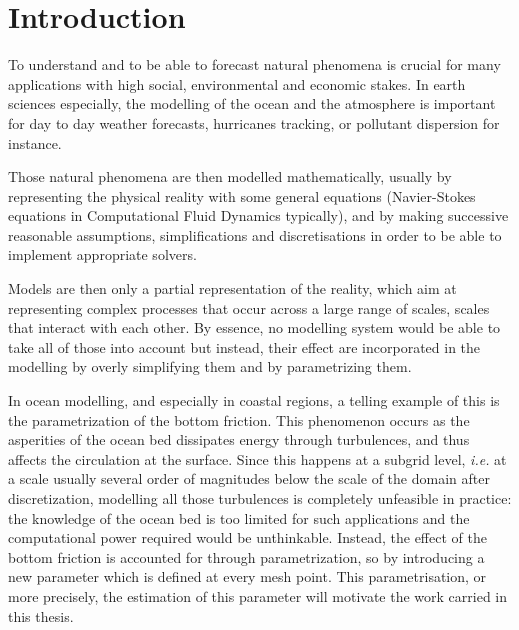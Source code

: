 \documentclass[../../Main_ManuscritThese.tex]{subfiles}
\begin{document}
\pagestyle{introStyle}
\chapter*{Introduction}
\TitleBtwLines
{}
{}
\label{chap:Introduction}
To understand and to be able to forecast natural phenomena is crucial
for many applications with high social, environmental and economic
stakes.  In earth sciences especially, the modelling of the ocean and
the atmosphere is important for day to day weather forecasts,
hurricanes tracking, or pollutant dispersion for instance. %

Those natural phenomena are then modelled mathematically, usually by
representing the physical reality with some general equations
(Navier-Stokes equations in Computational Fluid Dynamics typically),
and by making successive reasonable assumptions, simplifications and
discretisations in order to be able to implement appropriate
solvers.%

Models are then only a partial representation of the reality, which
aim at representing complex processes that occur across a large range
of scales, scales that interact with each other. By essence, no
modelling system would be able to take all of those into account but
instead, their effect are incorporated in the modelling by overly
simplifying them and by {parametrizing} them.

In ocean modelling, and especially in coastal regions, a telling
example of this is the parametrization of the bottom friction. This
phenomenon occurs as the asperities of the ocean bed dissipates energy
through turbulences, and thus affects the circulation at the
surface. Since this happens at a subgrid level, \emph{i.e.} at a scale
usually several order of magnitudes below the scale of the domain
after discretization, modelling all those turbulences is completely
unfeasible in practice: the knowledge of the ocean bed is too limited
for such applications and the computational power required would be
unthinkable. Instead, the effect of the bottom friction is accounted
for through parametrization, so by introducing a new parameter which
is defined at every mesh point.
This parametrisation, or more precisely, the estimation of this
parameter will motivate the work carried in this thesis.
\end{document}
